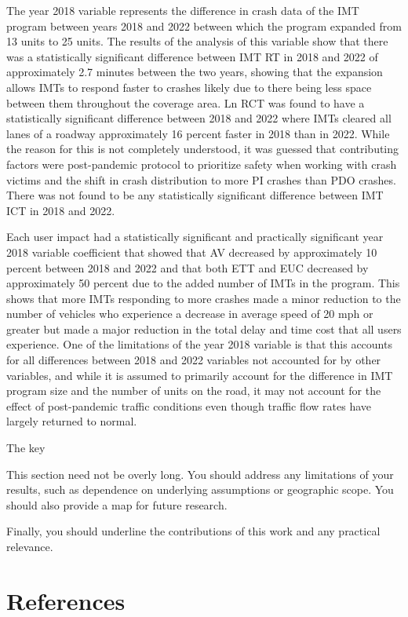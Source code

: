 \documentclass[
  letterpaper,
  authoryear]{elsarticle}
\begin{document}
The year 2018 variable represents the difference in crash data of the
IMT program between years 2018 and 2022 between which the program
expanded from 13 units to 25 units. The results of the analysis of this
variable show that there was a statistically significant difference
between IMT RT in 2018 and 2022 of approximately 2.7 minutes between the
two years, showing that the expansion allows IMTs to respond faster to
crashes likely due to there being less space between them throughout the
coverage area. Ln RCT was found to have a statistically significant
difference between 2018 and 2022 where IMTs cleared all lanes of a
roadway approximately 16 percent faster in 2018 than in 2022. While the
reason for this is not completely understood, it was guessed that
contributing factors were post-pandemic protocol to prioritize safety
when working with crash victims and the shift in crash distribution to
more PI crashes than PDO crashes. There was not found to be any
statistically significant difference between IMT ICT in 2018 and 2022.

Each user impact had a statistically significant and practically
significant year 2018 variable coefficient that showed that AV decreased
by approximately 10 percent between 2018 and 2022 and that both ETT and
EUC decreased by approximately 50 percent due to the added number of
IMTs in the program. This shows that more IMTs responding to more
crashes made a minor reduction to the number of vehicles who experience
a decrease in average speed of 20 mph or greater but made a major
reduction in the total delay and time cost that all users experience.
One of the limitations of the year 2018 variable is that this accounts
for all differences between 2018 and 2022 variables not accounted for by
other variables, and while it is assumed to primarily account for the
difference in IMT program size and the number of units on the road, it
may not account for the effect of post-pandemic traffic conditions even
though traffic flow rates have largely returned to normal.

The key

This section need not be overly long. You should address any limitations
of your results, such as dependence on underlying assumptions or
geographic scope. You should also provide a map for future research.

Finally, you should underline the contributions of this work and any
practical relevance.


\section*{References}\label{references}


\renewcommand{\bibsection}{}

\end{document}
